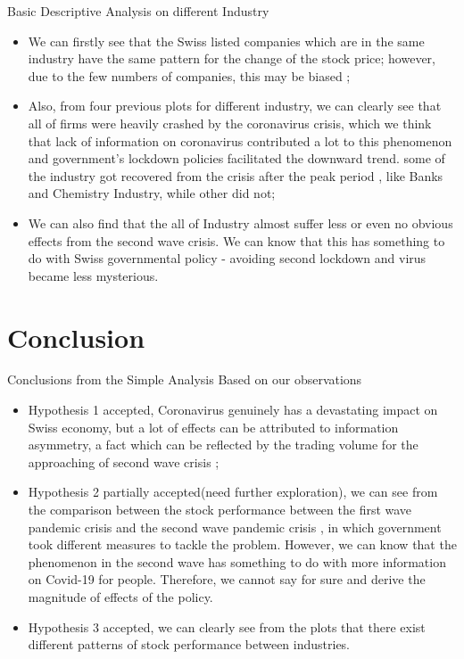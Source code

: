 \documentclass{beamer}
\begin{document}
\begin{frame}{Basic Descriptive Analysis on different Industry}
\begin{itemize}
    \item We can firstly see that the Swiss listed companies which are in the same industry have the same pattern for the change of the stock price; however, due to the few numbers of companies, this may be biased ;\\
    \item Also, from four previous plots for different industry, we can clearly see that all of firms were heavily crashed by the coronavirus crisis, which we think that lack of information on coronavirus contributed a lot to this phenomenon and government's lockdown policies facilitated the downward trend.  some of the industry got recovered from the crisis after the peak period , like Banks and Chemistry Industry, while other did not;\\
    \item We can also find that the all of Industry almost suffer less or even no obvious effects from the second wave crisis. We can know that this has something to do with Swiss governmental policy - avoiding second lockdown and virus became less mysterious.
\end{itemize}
\end{frame}


\section{Conclusion}

\begin{frame}{Conclusions from the Simple Analysis}
Based on our observations 
 \begin{itemize}
     \item Hypothesis 1 accepted, Coronavirus genuinely has a devastating impact on Swiss economy, but a lot of effects can be attributed to information asymmetry, a fact which can be reflected by the trading volume for the approaching of second wave crisis ;
     \item Hypothesis 2 partially accepted(need further exploration), we can see from the comparison between the stock performance between the first wave pandemic crisis and the second wave pandemic crisis , in which government took different measures to tackle the problem. However, we can know that the phenomenon in the second wave has something to do with more information on Covid-19 for people. Therefore, we cannot say for sure and derive the magnitude of effects of the policy. 
     \item Hypothesis 3 accepted, we can clearly see from the plots that there exist different patterns of stock performance between industries.
 \end{itemize}
\end{frame}




\end{document}
